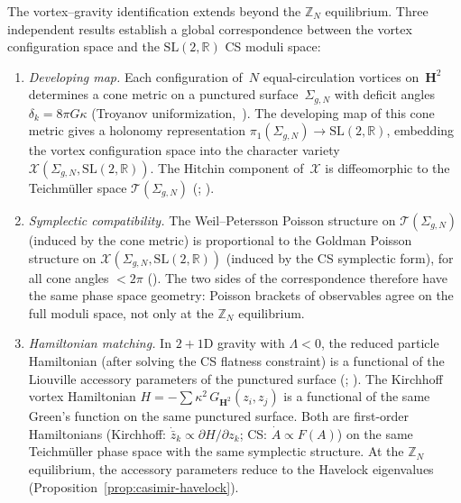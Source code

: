 \begin{proposition}
\label{prop:global-symplectic}
The vortex--gravity identification extends beyond
the $\mathbb{Z}_N$ equilibrium.
Three independent results establish a global correspondence
between the vortex configuration space and the
$\mathrm{SL}(2,\mathbb{R})$ CS moduli space:
\begin{enumerate}
\item \emph{Developing map.}
  Each configuration of~$N$ equal-circulation vortices
  on~$\mathbf{H}^2$ determines a cone metric on a punctured
  surface~$\Sigma_{g,N}$ with deficit angles
  $\delta_k = 8\pi G\kappa$
  (Troyanov uniformization,~\citeyear{Troyanov1991}).
  The developing map of this cone metric gives a
  holonomy representation
  $\pi_1(\Sigma_{g,N}) \to \mathrm{SL}(2,\mathbb{R})$,
  embedding the vortex configuration space into the
  character variety
  $\mathcal{X}(\Sigma_{g,N},\mathrm{SL}(2,\mathbb{R}))$.
  The Hitchin component of~$\mathcal{X}$ is
  diffeomorphic to the Teichm\"uller space
  $\mathcal{T}(\Sigma_{g,N})$
  (\citealt{Goldman1980}; \citealt{Hitchin1992}).
\item \emph{Symplectic compatibility.}
  The Weil--Petersson Poisson structure on
  $\mathcal{T}(\Sigma_{g,N})$ (induced by the cone
  metric) is proportional to the Goldman Poisson
  structure on
  $\mathcal{X}(\Sigma_{g,N},\mathrm{SL}(2,\mathbb{R}))$
  (induced by the CS symplectic form),
  for all cone angles $< 2\pi$
  (\citealt{Mondello2009}).
  The two sides of the correspondence therefore have the
  same phase space geometry: Poisson brackets of
  observables agree on the full moduli space,
  not only at the $\mathbb{Z}_N$ equilibrium.
\item \emph{Hamiltonian matching.}
  In $2{+}1$D gravity with $\Lambda < 0$, the reduced
  particle Hamiltonian
  (after solving the CS flatness constraint)
  is a functional of the Liouville accessory parameters
  of the punctured surface
  (\citealt{DeserJackiwHooft1984};
  \citealt{CantiniMenotti2003}).
  The Kirchhoff vortex Hamiltonian
  $H = -\sum\kappa^2\,G_{\mathbf{H}^2}(z_i, z_j)$
  is a functional of the same Green's function on
  the same punctured surface.
  Both are first-order Hamiltonians
  (Kirchhoff: $\dot{\bar z}_k \propto \partial H/\partial z_k$;
  CS: $\dot{A} \propto F(A)$) on the same Teichm\"uller
  phase space with the same symplectic structure.
  At the $\mathbb{Z}_N$ equilibrium, the accessory
  parameters reduce to the Havelock eigenvalues
  (Proposition~\ref{prop:casimir-havelock}).

\end{enumerate}
\end{proposition}
